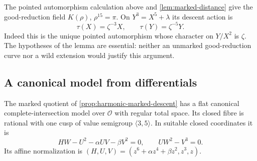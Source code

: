 The pointed automorphism calculation above and
\cref{lem:marked-distance} give the good-reduction field
$K(\rho)$, $\rho^{15}=\pi$.  On $Y^3=X^5+\lambda$ its descent
action is
\begin{equation}
 \tau(X)=\zeta^{-3}X,\qquad \tau(Y)=\zeta^{-5}Y.
\label{eq:harmonic-good-character}
\end{equation}
Indeed this is the unique pointed automorphism whose character on
$Y/X^2$ is $\zeta$.  The hypotheses of the lemma are essential:
neither an unmarked good-reduction curve nor a wild extension would
justify this argument.

\subsection{A canonical model from differentials}

\begin{lemma}
\label{lem:harmonic-canonical-lattice}
The marked quotient of \cref{prop:harmonic-marked-descent} has a flat
canonical complete-intersection model over $\mathcal O$ with regular
total space.  Its closed fibre is rational with one cusp of value
semigroup $\langle3,5\rangle$.  In suitable closed coordinates it is
\[
 HW-U^2-\alpha UV-\beta V^2=0,\qquad UW^2-V^3=0.
\]
Its affine normalization is
$(H,U,V)=(z^6+\alpha z^4+\beta z^2,z^3,z)$.
\end{lemma}

